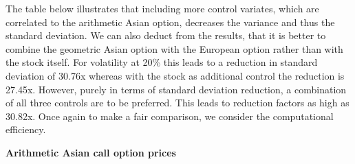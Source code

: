 \documentclass[11pt,a4paper,oneside]{article}
\begin{document}
The table below illustrates that including more control variates, which are correlated to the arithmetic Asian option, decreases the variance and thus the standard deviation. We can also deduct from the results, that it is better to combine the geometric Asian option with the European option rather than with the stock itself. For volatility at 20\% this leads to a reduction in standard deviation of 30.76x whereas with the stock as additional control the reduction is 27.45x. However, purely in terms of standard deviation reduction, a combination of all three controls are to be preferred. This leads to reduction factors as high as 30.82x. Once again to make a fair comparison, we consider the computational efficiency. 


\begin{table}[ht]
\centering
\captionsetup{justification=centering,margin=0.6cm}
\caption{\textbf{Arithmetic Asian call option prices}}


\end{table}
\end{document}
